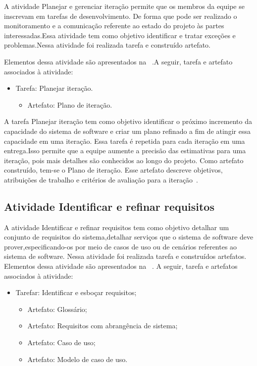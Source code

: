 A atividade Planejar e gerenciar iteração permite que os membros da equipe se inscrevam em tarefas de desenvolvimento. De forma que pode ser realizado o monitoramento e a comunicação referente ao estado do projeto às partes interessadas.Essa atividade tem como objetivo identificar e tratar exceções e problemas.Nessa atividade foi realizada tarefa e construído artefato. 

%

Elementos dessa atividade são apresentados na ~.A seguir, tarefa e artefato associados à atividade:

\begin{itemize}
    \item Tarefa: Planejar iteração.
        \begin{itemize}
            \item Artefato: Plano de iteração.
        \end{itemize}
\end{itemize}

A tarefa Planejar iteração tem como objetivo identificar o próximo incremento da capacidade do sistema de software e criar um plano refinado a fim de atingir essa capacidade em uma iteração. Essa tarefa é repetida para cada iteração em uma entrega.Isso permite que a equipe aumente a precisão das estimativas para uma iteração, pois mais detalhes são conhecidos ao longo do projeto. Como artefato construído, tem-se  o Plano de iteração. Esse artefato descreve objetivos, atribuições de trabalho e critérios de avaliação para a iteração~\cite{openup}.

\subsection{Atividade Identificar e refinar requisitos}

A atividade Identificar e refinar requisitos tem como objetivo detalhar um conjunto de requisitos do sistema,detalhar serviços que o sistema de software deve prover,especificando-os por meio de casos de uso ou de cenários referentes ao sistema de software. Nessa atividade foi realizada tarefa e construídos artefatos. Elementos dessa atividade são apresentados na ~. A seguir, tarefa e artefatos associados à atividade:

\begin{itemize}
    \item Tarefar: Identificar e esboçar requisitos;
        \begin{itemize}
            \item Artefato: Glossário;
            \item Artefato: Requisitos com abrangência de sistema;
            \item Artefato: Caso de uso;
            \item Artefato: Modelo de caso de uso.
        \end{itemize}
\end{itemize}

